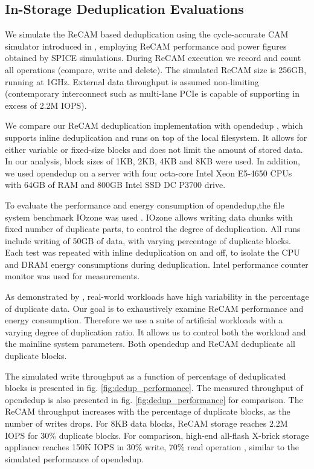 \documentclass{superfri}
\begin{document}
	
	\subsection{In-Storage Deduplication Evaluations}
	
	We simulate the ReCAM based deduplication using the cycle-accurate CAM simulator introduced in \cite{yavits2015resistive}, employing ReCAM performance and power figures obtained by SPICE simulations. During ReCAM execution we record and count all operations (compare, write and delete). The simulated ReCAM size is 256GB, running at 1GHz. External data throughput is assumed non-limiting (contemporary interconnect such as multi-lane PCIe is capable of supporting in excess of 2.2M IOPS).
	
	We compare our ReCAM deduplication implementation with opendedup \cite{silverberg2010opendedup}, which supports inline deduplication and runs on top of the local filesystem. It allows for either variable or fixed-size blocks and does not limit the amount of stored data. In our analysis, block sizes of 1KB, 2KB, 4KB and 8KB were used. In addition, we used opendedup on a server with four octa-core Intel Xeon E5-4650 CPUs with 64GB of RAM and 800GB Intel SSD DC P3700 drive.
	
	To evaluate the performance and energy consumption of opendedup,the file system benchmark IOzone was used \cite{norcott2003iozone}. IOzone allows writing data chunks with fixed number of duplicate parts, to control the degree of deduplication. All runs include writing of 50GB of data, with varying percentage of duplicate blocks. Each test was repeated with inline deduplication on and off, to isolate the CPU and DRAM energy consumptions during deduplication. Intel performance counter monitor \cite{intelPCM} was used for measurements. 
	
	As demonstrated by \cite{zhu2008avoiding}, real-world workloads have high variability in the percentage of duplicate data. Our goal is to exhaustively examine ReCAM performance and energy consumption. Therefore we use a suite of artificial workloads with a varying degree of duplication ratio. It allows us to control both the workload and the mainline system parameters. Both opendedup and ReCAM deduplicate all duplicate blocks.
	
	The simulated write throughput as a function of percentage of deduplicated blocks is presented in fig. \ref{fig:dedup_performance}. The measured throughput of opendedup is also presented in fig. \ref{fig:dedup_performance} for comparison. The ReCAM throughput increases with the percentage of duplicate blocks, as the number of writes drops. For 8KB data blocks, ReCAM storage reaches 2.2M IOPS for 30\% duplicate blocks. For comparison, high-end all-flash X-brick storage appliance reaches 150K IOPS in 30\% write, 70\% read operation \cite{XbrickSpec}, similar to the simulated performance of opendedup. 
	
\end{document}
